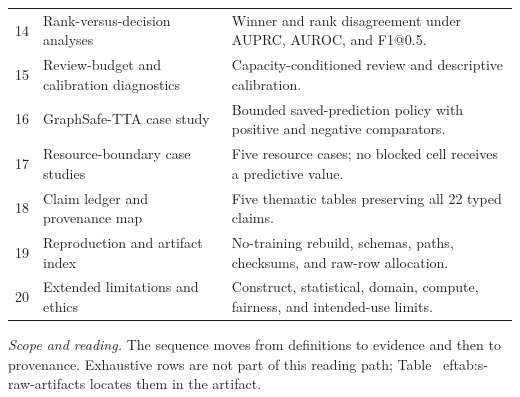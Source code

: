\begin{longtable}{@{}r p{} p{}@{}}
14 & Rank-versus-decision analyses & Winner and rank disagreement under AUPRC, AUROC, and F1@0.5. \\
15 & Review-budget and calibration diagnostics & Capacity-conditioned review and descriptive calibration. \\
16 & GraphSafe-TTA case study & Bounded saved-prediction policy with positive and negative comparators. \\
17 & Resource-boundary case studies & Five resource cases; no blocked cell receives a predictive value. \\
18 & Claim ledger and provenance map & Five thematic tables preserving all 22 typed claims. \\
19 & Reproduction and artifact index & No-training rebuild, schemas, paths, checksums, and raw-row allocation. \\
20 & Extended limitations and ethics & Construct, statistical, domain, compute, fairness, and intended-use limits. \\
\end{longtable}
\noindent\footnotesize\emph{Scope and reading.} The sequence moves from definitions to evidence and then to provenance. Exhaustive rows are not part of this reading path; Table~
ef{tab:s-raw-artifacts} locates them in the artifact.\par
\endgroup
